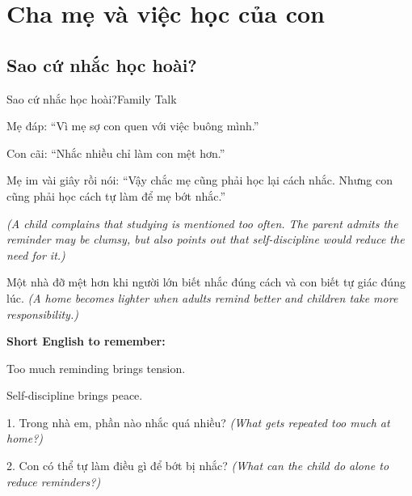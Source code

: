 \chapter{Cha mẹ và việc học của con}

\section{Sao cứ nhắc học hoài?}
\begin{truyen}{Sao cứ nhắc học hoài?}{Family Talk}

Mẹ đáp: ``Vì mẹ sợ con quen với việc buông mình.''

Con cãi: ``Nhắc nhiều chỉ làm con mệt hơn.''

Mẹ im vài giây rồi nói: ``Vậy chắc mẹ cũng phải học lại cách nhắc. Nhưng con cũng phải học cách tự làm để mẹ bớt nhắc.''

\textit{(A child complains that studying is mentioned too often. The parent admits the reminder may be clumsy, but also points out that self-discipline would reduce the need for it.)}
\end{truyen}

\begin{baihoc}
Một nhà đỡ mệt hơn khi người lớn biết nhắc đúng cách và con biết tự giác đúng lúc.
\textit{(A home becomes lighter when adults remind better and children take more responsibility.)}
\end{baihoc}

\begin{ghinhoanh}
\textbf{Short English to remember:}

Too much reminding brings tension.

Self-discipline brings peace.
\end{ghinhoanh}

\begin{tuhocnhanh}
1. Trong nhà em, phần nào nhắc quá nhiều? \textit{(What gets repeated too much at home?)}

2. Con có thể tự làm điều gì để bớt bị nhắc? \textit{(What can the child do alone to reduce reminders?)}
\end{tuhocnhanh}
\ngancach

